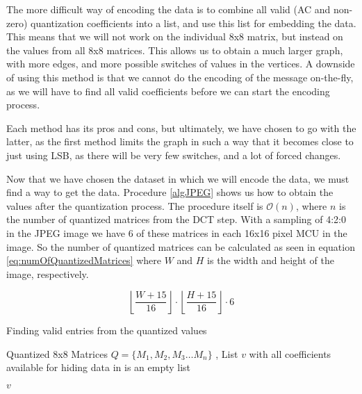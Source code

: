 The more difficult way of encoding the data is to combine all valid (AC and non-zero) quantization coefficients into a list, and use this list for embedding the data. 
This means that we will not work on the individual 8x8 matrix, but instead on the values from all 8x8 matrices. 
This allows us to obtain a much larger graph, with more edges, and more possible switches of values in the vertices. 
A downside of using this method is that we cannot do the encoding of the message on-the-fly, as we will have to find all valid coefficients before we can start the encoding process.

Each method has its pros and cons, but ultimately, we have chosen to go with the latter, as the first method limits the graph in such a way that it becomes close to just using LSB, as there will be very few switches, and a lot of forced changes.

Now that we have chosen the dataset in which we will encode the data, we must find a way to get the data. 
Procedure \ref{algJPEG} shows us how to obtain the values after the quantization process. 
The procedure itself is $\mathcal{O}(n)$, where $n$ is the number of quantized matrices from the DCT step. 
With a sampling of 4:2:0 in the JPEG image we have 6 of these matrices in each 16x16 pixel MCU in the image. 
So the number of quantized matrices can be calculated as seen in equation \ref{eq:numOfQuantizedMatrices} where $W$ and $H$ is the width and height of the image, respectively.

\begin{equation}
\label{eq:numOfQuantizedMatrices}
\left \lfloor \frac{W + 15}{16}\right \rfloor \cdot \left \lfloor \frac{H + 15}{16}\right \rfloor \cdot 6
\end{equation}

\begin{algorithm}
\caption{Finding valid entries from the quantized values}
\label{algJPEG}
\begin{algorithmic}
\REQUIRE Quantized 8x8 Matrices $Q = \{ M_1, M_2, M_3 \ldots M_n \}$ ,
\ENSURE List $v$ with all coefficients available for hiding data in
 is an empty list
            \ENDIF
        \ENDFOR
    \ENDFOR
\ENDFOR

\RETURN $v$
\end{algorithmic}
\end{algorithm}

